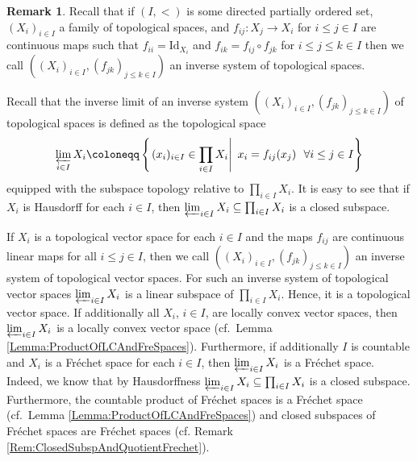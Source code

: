 \documentclass[12pt,a4paper]{article}
\theoremstyle{plain}
\theoremstyle{definition}
\newtheorem{remark}[theorem]{Remark}
\begin{document}
\begin{remark}
\label{Rem:InvLim}
Recall that if $(I,<)$ is some directed partially ordered set, $(X_i)_{i\in I}$ a family of topological spaces, and $f_{ij}:X_j\to X_i$ for $i\leq j\in I$ are continuous maps such that $f_{ii}=\mathrm{Id}_{X_i}$ and $f_{ik}=f_{ij}\circ f_{jk}$ for $i\leq j\leq k\in I$ then we call $((X_i)_{i\in I},(f_{jk})_{j\leq k\in I})$ an inverse system of topological spaces.

Recall that the inverse limit of an inverse system $((X_i)_{i\in I},(f_{jk})_{j\leq k\in I})$ of topological spaces is defined as the topological space
\begin{align*}
    \varprojlim_{i\in I}X_i\coloneqq \left\{\left.(x_i)_{i\in I}\in\prod_{i\in I}X_i\right|~ x_i=f_{ij}(x_j)~~\forall i\leq j\in I\right\}
\end{align*}
equipped with the subspace topology relative to $\prod_{i\in I}X_i$. It is easy to see that if $X_i$ is Hausdorff for each $i\in I$, then $\varprojlim_{i\in I}X_i\subseteq \prod_{i\in I}X_i$ is a closed subspace.

If $X_i$ is a topological vector space for each $i\in I$ and the maps $f_{ij}$ are continuous linear maps for all $i\leq j\in I$, then we call $((X_i)_{i\in I},(f_{jk})_{j\leq k\in I})$ an inverse system of topological vector spaces.
For such an inverse system of topological vector spaces $\varprojlim_{i\in I}X_i$ is a linear subspace of $\prod_{i\in I}X_i$. Hence, it is a topological vector space.
If additionally all $X_i$, $i\in I$, are locally convex vector spaces, then $\varprojlim_{i\in I}X_i$ is a locally convex vector space (cf.~Lemma \ref{Lemma:ProductOfLCAndFreSpaces}).
Furthermore, if additionally $I$ is countable and $X_i$ is a Fréchet space for each $i\in I$, then $\varprojlim_{i\in I}X_i$ is a Fréchet space. Indeed, we know that by Hausdorffness $\varprojlim_{i\in I}X_i\subseteq \prod_{i\in I}X_i$ is a closed subspace. Furthermore, the countable product of Fréchet spaces is a Fréchet space (cf.~Lemma \ref{Lemma:ProductOfLCAndFreSpaces}) and closed subspaces of Fréchet spaces are Fréchet spaces (cf. Remark \ref{Rem:ClosedSubspAndQuotientFrechet}). 
\end{remark}
\end{document}

